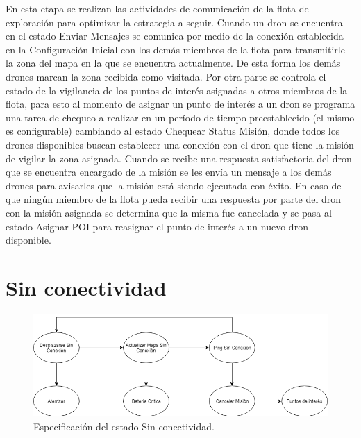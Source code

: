 En esta etapa se realizan las actividades de comunicación de la flota de exploración para optimizar la estrategia a seguir.
Cuando un dron se encuentra en el estado Enviar Mensajes se comunica por medio de la conexión establecida en la Configuración Inicial con los demás miembros de la flota para transmitirle la zona del mapa en la que se encuentra actualmente. De esta forma los demás drones marcan la zona recibida como visitada.
Por otra parte se controla el estado de la vigilancia de los puntos de interés asignadas a otros miembros de la flota, para esto al momento de asignar un punto de interés a un dron se programa una tarea de chequeo a realizar en un período de tiempo preestablecido (el mismo es configurable) cambiando al estado Chequear Status Misión, donde todos los drones disponibles buscan establecer una conexión con el dron que tiene la misión de vigilar la zona asignada. Cuando se recibe una respuesta satisfactoria del dron que se encuentra encargado de la misión se les envía un mensaje a los demás drones para avisarles que la misión está siendo ejecutada con éxito. En caso de que ningún miembro de la flota pueda recibir una respuesta por parte del dron con la misión asignada se determina que la misma fue cancelada y se pasa al estado Asignar POI para reasignar el punto de interés a un nuevo dron disponible.
\section {Sin conectividad}


\begin{figure}[h!]
	\label{fig:comp}
	\includegraphics[width=.8\textwidth]{imagenes/chap5/image7}
	\caption{Especificación del estado Sin conectividad.}
\end{figure}

